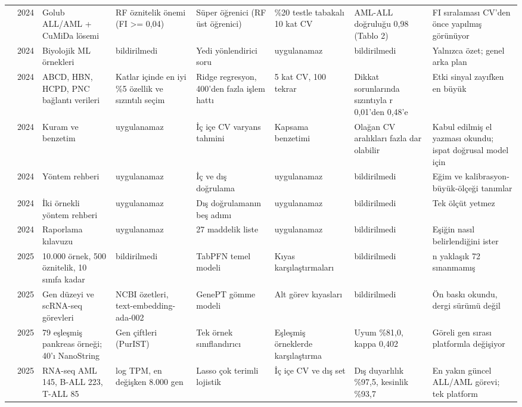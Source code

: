 \begin{longtable}{@{}p{0.9cm}p{0.5cm}p{2.3cm}p{2.6cm}p{2.6cm}p{2.3cm}p{2.6cm}p{2.4cm}@{}}
\cite{selvaraj2024} & 2024 & Golub ALL/AML + CuMiDa lösemi & RF öznitelik önemi (FI >= 0,04) & Süper öğrenici (RF üst öğrenici) & \%20 testle tabakalı 10 kat CV & AML-ALL doğruluğu 0,98 (Tablo 2) & FI sıralaması CV'den önce yapılmış görünüyor\\
\cite{bernett2024} & 2024 & Biyolojik ML örnekleri & bildirilmedi & Yedi yönlendirici soru & uygulanamaz & bildirilmedi & Yalnızca özet; genel arka plan\\
\cite{rosenblatt2024} & 2024 & ABCD, HBN, HCPD, PNC bağlantı verileri & Katlar içinde en iyi \%5 özellik ve sızıntılı seçim & Ridge regresyon, 400'den fazla işlem hattı & 5 kat CV, 100 tekrar & Dikkat sorunlarında sızıntıyla r 0,01'den 0,48'e & Etki sinyal zayıfken en büyük\\
\cite{bates2024} & 2024 & Kuram ve benzetim & uygulanamaz & İç içe CV varyans tahmini & Kapsama benzetimi & Olağan CV aralıkları fazla dar olabilir & Kabul edilmiş el yazması okundu; ispat doğrusal model için\\
\cite{collins2024part1} & 2024 & Yöntem rehberi & uygulanamaz & İç ve dış doğrulama & uygulanamaz & bildirilmedi & Eğim ve kalibrasyon-büyük-ölçeği tanımlar\\
\cite{riley2024part2} & 2024 & İki örnekli yöntem rehberi & uygulanamaz & Dış doğrulamanın beş adımı & uygulanamaz & bildirilmedi & Tek ölçüt yetmez\\
\cite{collins2024tripod} & 2024 & Raporlama kılavuzu & uygulanamaz & 27 maddelik liste & uygulanamaz & bildirilmedi & Eşiğin nasıl belirlendiğini ister\\
\cite{hollmann2025} & 2025 & 10.000 örnek, 500 öznitelik, 10 sınıfa kadar & bildirilmedi & TabPFN temel modeli & Kıyas karşılaştırmaları & bildirilmedi & n yaklaşık 72 sınanmamış\\
\cite{chen2025genept} & 2025 & Gen düzeyi ve scRNA-seq görevleri & NCBI özetleri, text-embedding-ada-002 & GenePT gömme modeli & Alt görev kıyasları & bildirilmedi & Ön baskı okundu, dergi sürümü değil\\
\cite{lee2025} & 2025 & 79 eşleşmiş pankreas örneği; 40'ı NanoString & Gen çiftleri (PurIST) & Tek örnek sınıflandırıcı & Eşleşmiş örneklerde karşılaştırma & Uyum \%81,0, kappa 0,402 & Göreli gen sırası platformla değişiyor\\
\cite{mulet2025} & 2025 & RNA-seq AML 145, B-ALL 223, T-ALL 85 & log TPM, en değişken 8.000 gen & Lasso çok terimli lojistik & İç içe CV ve dış set & Dış duyarlılık \%97,5, kesinlik \%93,7 & En yakın güncel ALL/AML görevi; tek platform\\

\end{longtable}

